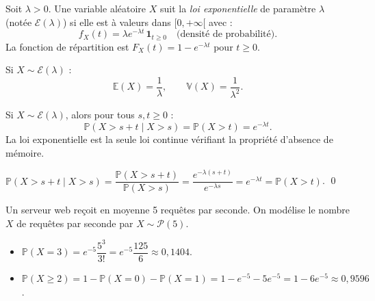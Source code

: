 \documentclass[11pt,a4paper,twoside]{book}
\begin{document}
\begin{definitionbox}
Soit $\lambda > 0$. Une variable aléatoire $X$ suit la \emph{loi exponentielle} de paramètre $\lambda$
(notée $\mathcal{E}(\lambda)$) si elle est à valeurs dans $[0,+\infty[$ avec :
\[
  f_X(t) = \lambda e^{-\lambda t}\, \mathbf{1}_{t \geq 0} \quad \text{(densité de probabilité)}.
\]
La fonction de répartition est $F_X(t) = 1 - e^{-\lambda t}$ pour $t \geq 0$.
\end{definitionbox}

\begin{theoremebox}
Si $X \sim \mathcal{E}(\lambda)$ :
\[
  \mathbb{E}(X) = \frac{1}{\lambda}, \qquad \mathbb{V}(X) = \frac{1}{\lambda^2}.
\]
\end{theoremebox}

\begin{theoremebox}
Si $X \sim \mathcal{E}(\lambda)$, alors pour tous $s, t \geq 0$ :
\[
  \mathbb{P}(X > s+t \mid X > s) = \mathbb{P}(X > t) = e^{-\lambda t}.
\]
La loi exponentielle est la seule loi continue vérifiant la propriété d'absence de mémoire.
\end{theoremebox}

\begin{preuvebox}
$\mathbb{P}(X > s+t \mid X > s) = \dfrac{\mathbb{P}(X > s+t)}{\mathbb{P}(X > s)}
= \dfrac{e^{-\lambda(s+t)}}{e^{-\lambda s}} = e^{-\lambda t} = \mathbb{P}(X > t)$. \qed
\end{preuvebox}

\begin{exemplebox}
Un serveur web reçoit en moyenne 5 requêtes par seconde.
On modélise le nombre $X$ de requêtes par seconde par $X \sim \mathcal{P}(5)$.
\begin{itemize}
  \item $\mathbb{P}(X = 3) = e^{-5}\dfrac{5^3}{3!} = e^{-5}\dfrac{125}{6} \approx 0{,}1404$.
  \item $\mathbb{P}(X \geq 2) = 1 - \mathbb{P}(X=0) - \mathbb{P}(X=1)
    = 1 - e^{-5} - 5e^{-5} = 1 - 6e^{-5} \approx 0{,}9596$.
\end{itemize}
\end{exemplebox}
\end{document}
